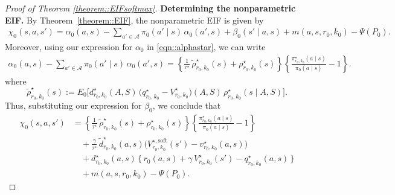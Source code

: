 \documentclass[11pt]{article}
\theoremstyle{plain}
\begin{document}
\begin{proof}[Proof of Theorem \ref{theorem::EIFsoftmax}]
\noindent \textbf{Determining the nonparametric EIF.}
By Theorem~\ref{theorem::EIF}, the nonparametric EIF is given by
\begin{align*}
   \chi_0(s,a,s') = \alpha_0(a,s) - \sum_{a'\in\mathcal{A}} \pi_{0}(a'\mid s)\,\alpha_0(a',s)  + \beta_0(s'\mid a,s) + m(a,s,r_0,k_0) - \Psi(P_0).
\end{align*}
Moreover, using our expression for $\alpha_0$ in \eqref{eqn::alphastar}, we can write
\begin{align*}
 \alpha_0(a,s) - \sum_{a'\in\mathcal{A}} \pi_0(a'\mid s)\,\alpha_0(a',s) 
=  \left\{\frac{1}{\tau^\star}\,\widetilde{\rho}_{r_0,k_0}^\star(s)  + \rho_{r_0,k_0}^{\star}(s) \right\} \left\{\frac{\pi_{r_0,k_0}^\star(a\mid s)}{\pi_0(a\mid s)} - 1\right\}.
\end{align*}
where
\[
\widetilde{\rho}_{r_0,k_0}^\star(s)
:= E_0\!\big[d_{r_0,k_0}^\star(A,S)\,\big(q_{r_0,k_0}^\star - V_{r_0,k_0}^{\star}\big)(A,S)\,\rho_{r_0,k_0}^\star(s\mid A,S)\big].
\]
Thus, substituting our expression for $\beta_0$, we conclude that
\begin{align*}
   \chi_0(s,a,s') &= \left\{\frac{1}{\tau^\star}\,\widetilde{\rho}_{r_0,k_0}^\star(s)  + \rho_{r_0,k_0}^{\star}(s) \right\} \left\{\frac{\pi_{r_0,k_0}^\star(a\mid s)}{\pi_0(a\mid s)} - 1\right\}  \\
   &\quad + \frac{\gamma}{\tau^\star}\,\widetilde{d}_{r_0,k_0}^\star(a,s)\Big(V_{r_0,k_0}^{\star,\mathrm{soft}}(s')-v_{r_0,k_0}^\star(a,s)\Big) \\
   &\quad + d_{r_0,k_0}^\star(a,s)\,\Big\{\,r_0(a,s) + \gamma\,V_{r_0,k_0}^{\star}(s') - q_{r_0,k_0}^\star(a,s)\,\Big\}\\
   &\quad + m(a,s, r_0, k_0) - \Psi(P_0).
\end{align*}


 
 

\end{proof}
\end{document}
